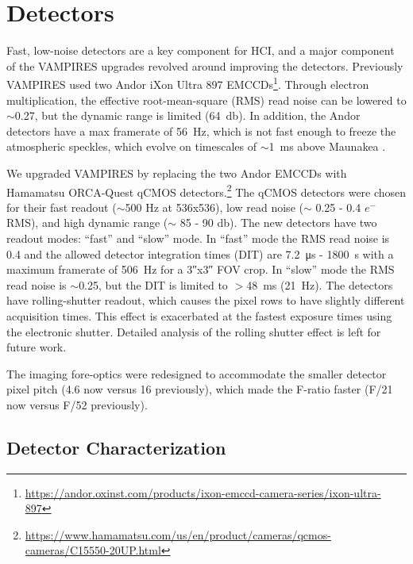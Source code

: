 \section{Detectors}\label{sec:detectors}

Fast, low-noise detectors are a key component for HCI, and a major component of the VAMPIRES upgrades revolved around improving the detectors. Previously VAMPIRES used two Andor iXon Ultra 897 EMCCDs\footnote{\url{https://andor.oxinst.com/products/ixon-emccd-camera-series/ixon-ultra-897}}. Through electron multiplication, the effective root-mean-square (RMS) read noise can be lowered to $\sim$\SI{0.27}{\electron}, but the dynamic range is limited (\SI{64}{\decibel}). In addition, the Andor detectors have a max framerate of \SI{56}{\hertz}, which is not fast enough to freeze the atmospheric speckles, which evolve on timescales of $\sim$\SI{1}{\milli\second} above Maunakea \citep{kooten_climate_2022}. 

We upgraded VAMPIRES by replacing the two Andor EMCCDs with Hamamatsu ORCA-Quest qCMOS detectors.\footnote{\url{https://www.hamamatsu.com/us/en/product/cameras/qcmos-cameras/C15550-20UP.html}} The qCMOS detectors were chosen for their fast readout ($\sim$500 Hz at 536x536), low read noise ($\sim$ 0.25 - 0.4 $e^-$ RMS), and high dynamic range ($\sim$ 85 - 90 \si{\decibel}). The new detectors have two readout modes: ``fast'' and ``slow'' mode. In ``fast'' mode the RMS read noise is \SI{0.4}{\electron} and the allowed detector integration times (DIT) are \SI{7.2}{\micro\second} - \SI{1800}{\second} with a maximum framerate of \SI{506}{\hertz} for a \ang{;;3}x\ang{;;3} FOV crop. In ``slow'' mode the RMS read noise is $\sim$\SI{0.25}{\electron}, but the DIT is limited to $>$\SI{48}{\milli\second} (\SI{21}{\hertz}). The detectors have rolling-shutter readout, which causes the pixel rows to have slightly different acquisition times. This effect is exacerbated at the fastest exposure times using the electronic shutter. Detailed analysis of the rolling shutter effect is left for future work.

The imaging fore-optics were redesigned to accommodate the smaller detector pixel pitch (\SI{4.6}{\micron} now versus \SI{16}{\micron} previously), which made the F-ratio faster (F/21 now versus F/52 previously).

\subsection{Detector Characterization}

